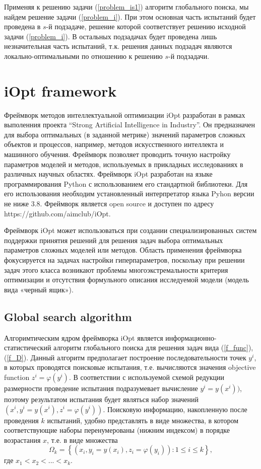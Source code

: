 \documentclass[preprint,12pt]{elsarticle}
\begin{document}
Применяя к решению задачи (\ref{problem_is1}) алгоритм глобального поиска, мы найдем решение задачи (\ref{problem_i}). При этом основная часть испытаний будет проведена в $s$-й подзадаче, решение которой соответствует решению исходной задачи (\ref{problem_i}). В остальных подзадачах будет проведена лишь незначительная часть испытаний, т.к. решения данных подзадач являются локально-оптимальными по отношению к решению $s$-й подзадачи.

\section{iOpt framework} 
\label{sec_iOpt}


Фреймворк методов интеллектуальной оптимизации iOpt разработан в рамках выполенния проекта ``Strong Artificial Intelligence in Industry''.
Он предназначен для выбора оптимальных (в заданной метрике) значений параметров сложных объектов и процессов, например, методов искусственного интеллекта и машинного обучения. Фреймворк позволяет проводить точную настройку параметров моделей и методов, используемых в прикладных исследованиях в различных научных областях. Фреймворк iOpt разработан на языке программирования Python с использованием его стандартной библиотеки. Для его использования необходим установленный интерпретатор языка Pyhon версии не ниже 3.8. Фреймворк является open source и доступен по адресу https://github.com/aimclub/iOpt.

Фреймворк iOpt может использоваться при создании специализированных систем поддержки принятия решений для решения задач выбора оптимальных параметров сложных моделей или методов. Область применения фреймворка фокусируется на задачах настройки гиперпараметров, поскольку при решении задач этого класса возникают проблемы многоэкстремальности критерия оптимизации и отсутствия формульного описания исследуемой модели (модель вида «черный ящик»). 


\subsection{Global search algorithm}
\label{sec_GSA}

Алгоримтическим ядром фреймворка iOpt является информационно-статистический алгоритм глобального поиска для решения задач вида (\ref{f_func}), (\ref{f_D}). 
Данный алгоритм предполагает построение последовательности точек $y^i$, в которых проводятся поисковые испытания, т.е. вычисляются значения objective function $z^i = \varphi(y^i)$. В соответствии с используемой схемой редукции размерности проведение испытания подразумевает вычисление $y^i=y(x^i))$, поэтому результатом испытания будет являться набор значений $(x^i, y^i=y(x^i), z^i = \varphi(y^i))$. 
Поисковую информацию, накопленную после проведения $k$ испытаний, удобно представлять в виде множества, в котором соответствующие наборы перенумерованы (нижним индексом) в порядке возрастания $x$, т.е. в виде множества 
\begin{equation}\label{omega}
\Omega_k = \left\{  (x_i, y_i=y(x_i), z_i = \varphi(y_i)): 1 \leq i \leq k  \right\},	
\end{equation}
где $x_1 < x_2 < ... < x_k$.
\end{document}
